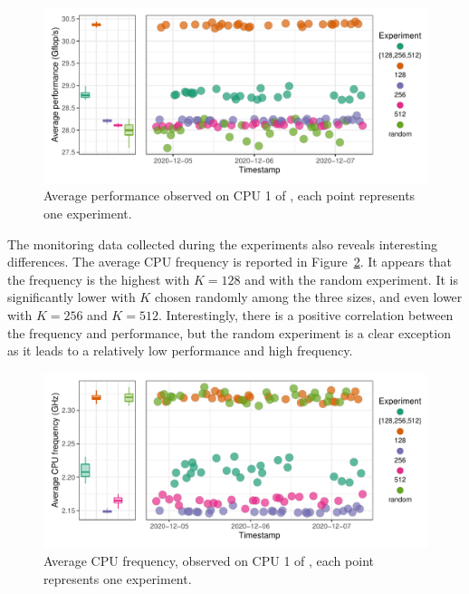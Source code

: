            \begin{figure}[htpb]
                \centering
                \includegraphics[width=1\linewidth]{img/experiment/randomizing_sizes/fixing_K/average_performance.pdf}
                \caption{Average \dgemm performance observed on CPU 1 of \dahu[5], each point represents one experiment.}%
                \label{fig:randomizing_sizes:expfile:fixing_K:performance}
            \end{figure}

            The monitoring data collected during the experiments also reveals interesting differences. The average CPU
            frequency is reported in Figure~\ref{fig:randomizing_sizes:expfile:fixing_K:frequency}. It appears that the
            frequency is the highest with \(K=128\) and with the random experiment. It is significantly lower with \(K\)
            chosen randomly among the three sizes, and even lower with \(K=256\) and \(K=512\). Interestingly,
            there is a positive correlation between the frequency and \dgemm performance, but the random
            experiment is a clear exception as it leads to a relatively low performance and high frequency.

            \begin{figure}[htpb]
                \centering
                \includegraphics[width=1\linewidth]{img/experiment/randomizing_sizes/fixing_K/average_frequency.pdf}
                \caption{Average CPU frequency, observed on CPU 1 of \dahu[5], each point represents one experiment.}%
                \label{fig:randomizing_sizes:expfile:fixing_K:frequency}
            \end{figure}

